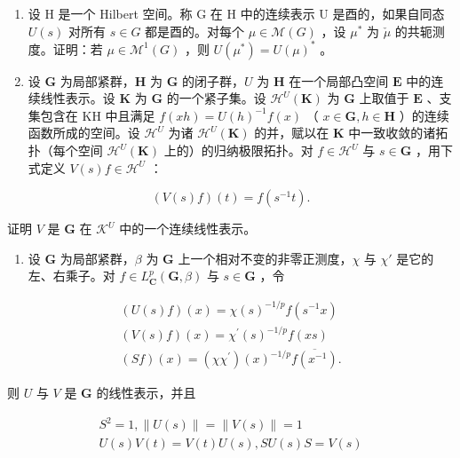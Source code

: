 \begin{enumerate}
\def\labelenumi{\arabic{enumi})}
\setcounter{enumi}{3}
\item
  设 H 是一个 Hilbert 空间。称 G 在 H 中的连续表示 U 是酉的，如果自同态 \(U(s)\) 对所有 \(s \in G\) 都是酉的。对每个 \(\mu \in \mathcal{M}(G)\) ，设 \(\mu^{*}\) 为 \(\check{\mu}\) 的共轭测度。证明：若 \(\mu \in \mathcal{M}^{1}(G)\) ，则 \(U(\mu^{*}) = U(\mu)^{*}\) 。
\item
  设 \(\mathbf{G}\) 为局部紧群，\(\mathbf{H}\) 为 \(\mathbf{G}\) 的闭子群，\(U\) 为 \(\mathbf{H}\) 在一个局部凸空间 \(\mathbf{E}\) 中的连续线性表示。设 \(\mathbf{K}\) 为 \(\mathbf{G}\) 的一个紧子集。设 \(\mathcal{H}^U(\mathbf{K})\) 为 \(\mathbf{G}\) 上取值于 \(\mathbf{E}\) 、支集包含在 \(\mathrm{KH}\) 中且满足 \(f(xh) = U(h)^{-1}f(x)\) （ \(x \in \mathbf{G}, h \in \mathbf{H}\) ）的连续函数所成的空间。设 \(\mathcal{H}^U\) 为诸 \(\mathcal{H}^U(\mathbf{K})\) 的并，赋以在 \(\mathbf{K}\) 中一致收敛的诸拓扑（每个空间 \(\mathcal{H}^U(\mathbf{K})\) 上的）的归纳极限拓扑。对 \(f \in \mathcal{H}^U\) 与 \(s \in \mathbf{G}\) ，用下式定义 \(V(s)f \in \mathcal{H}^U\) ：
\end{enumerate}

\[
(V (s) f) (t) = f \left(s ^ {- 1} t\right).
\]

证明 \(V\) 是 \(\mathbf{G}\) 在 \(\mathcal{K}^U\) 中的一个连续线性表示。

\begin{enumerate}
\def\labelenumi{\arabic{enumi})}
\setcounter{enumi}{5}
\tightlist
\item
  设 \(\mathbf{G}\) 为局部紧群，\(\beta\) 为 \(\mathbf{G}\) 上一个相对不变的非零正测度，\(\chi\) 与 \(\chi'\) 是它的左、右乘子。对 \(f \in L_{\mathbf{C}}^{p}(\mathbf{G}, \beta)\) 与 \(s \in \mathbf{G}\) ，令
\end{enumerate}

\[
\begin{array}{c} (U (s) f) (x) = \chi (s) ^ {- 1 / p} f (s ^ {- 1} x) \\ (V (s) f) (x) = \chi^ {\prime} (s) ^ {- 1 / p} f (x s) \\ (S f) (x) = (\chi \chi^ {\prime}) (x) ^ {- 1 / p} \overline {{f (x ^ {- 1})}}. \end{array}
\]

则 \(U\) 与 \(V\) 是 \(\mathbf{G}\) 的线性表示，并且

\[
\begin{array}{c} S ^ {2} = 1, \| U (s) \| = \| V (s) \| = 1 \\ U (s) V (t) = V (t) U (s), S U (s) S = V (s) \end{array}
\]

